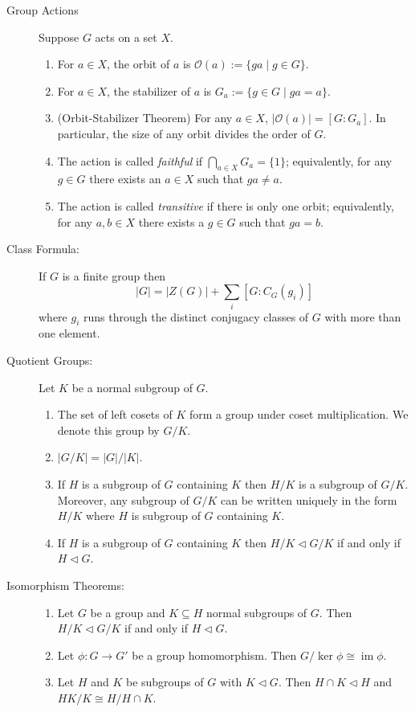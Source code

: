 \documentclass[12pt]{article}
\begin{document}
\begin{description}
\item[Group Actions]  Suppose $G$ acts on a set $X$.
\begin{enumerate}
\item For $a\in X$, the orbit of $a$ is $\mathcal{O}(a):=\{ga \mid g\in G\}$.
\item For $a\in X$, the stabilizer of $a$ is $G_a:=\{g\in G\mid ga=a\}$.
\item (Orbit-Stabilizer Theorem) For any $a\in X$, $|\mathcal{O}(a)|=[G:G_a]$.  In particular, the size of any orbit divides the order of $G$.
\item The action is called {\it faithful} if $\bigcap_{a\in X} G_a=\{1\}$; equivalently, for any $g\in G$ there exists an $a\in X$ such that $ga\neq a$.
\item The action is called {\it transitive} if there is only one orbit; equivalently, for any $a,b\in X$ there exists a $g\in G$ such that $ga=b$.
\end{enumerate}


\item[Class Formula:]  If $G$ is a finite group then 
$$|G|=|Z(G)|+\sum_i [G:C_G(g_i)]$$
where $g_i$ runs through the distinct conjugacy classes of $G$ with more than one element.

\item[Quotient Groups:] Let $K$ be a normal subgroup of $G$.
\begin{enumerate}
\item The set of left cosets of $K$ form a group under coset multiplication.  We denote this group by $G/K$.
\item $|G/K|=|G|/|K|$.
\item If $H$ is a subgroup of $G$ containing $K$ then $H/K$ is a subgroup of $G/K$.  Moreover, any subgroup of $G/K$ can be written uniquely in the form $H/K$ where $H$ is subgroup of $G$ containing $K$.
\item If $H$ is a subgroup of $G$ containing $K$ then $H/K \triangleleft G/K$ if and only if $H\triangleleft G$.  
\end{enumerate}

\item[Isomorphism Theorems:]
\begin{enumerate}  
\item Let $G$ be a group and $K\subseteq H$ normal subgroups of $G$.  Then $H/K \triangleleft G/K$ if and only if $H\triangleleft G$.
\item Let $\phi:G\to G'$ be a group homomorphism.  Then $G/\ker \phi \cong \operatorname{im} \phi$.
\item Let $H$ and $K$ be subgroups of $G$ with $K\triangleleft G$.  Then $H\cap K\triangleleft H$ and $HK/K \cong H/H\cap K$.
\end{enumerate}





\end{description}
\end{document}
